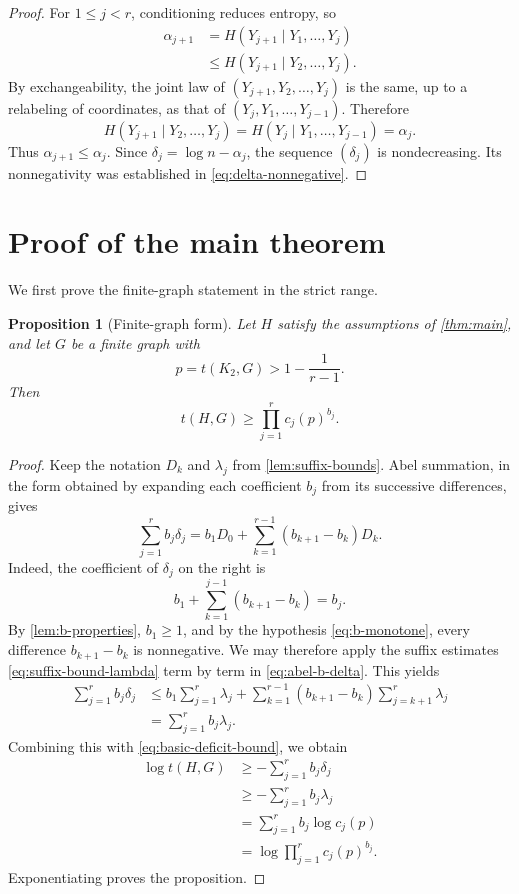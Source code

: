 \documentclass[11pt]{article}
\newtheorem{proposition}[proposition]{Proposition}
\numberwithin{equation}{section}
\begin{document}
\begin{proof}
For $1\leq j<r$, conditioning reduces entropy, so
\[
 \begin{aligned}
 \alpha_{j+1}
 &=H(Y_{j+1}\mid Y_1,\dots,Y_j)\\
 &\leq H(Y_{j+1}\mid Y_2,\dots,Y_j).
 \end{aligned}
\]
By exchangeability, the joint law of
$(Y_{j+1},Y_2,\dots,Y_j)$ is the same, up to a relabeling of coordinates,
as that of $(Y_j,Y_1,\dots,Y_{j-1})$.  Therefore
\[
 H(Y_{j+1}\mid Y_2,\dots,Y_j)
 =H(Y_j\mid Y_1,\dots,Y_{j-1})
 =\alpha_j.
\]
Thus $\alpha_{j+1}\leq\alpha_j$.  Since
$\delta_j=\log n-\alpha_j$, the sequence $(\delta_j)$ is nondecreasing.
Its nonnegativity was established in \eqref{eq:delta-nonnegative}.
\end{proof}

\section{Proof of the main theorem}\label{sec:main-proof}

We first prove the finite-graph statement in the strict range.

\begin{proposition}[Finite-graph form]\label{prop:finite-main}
Let $H$ satisfy the assumptions of \cref{thm:main}, and let $G$ be a
finite graph with
\[
 p=t(K_2,G)>1-\frac{1}{r-1}.
\]
Then
\[
 t(H,G)\geq\prod_{j=1}^r c_j(p)^{b_j}.
\]
\end{proposition}

\begin{proof}
Keep the notation $D_k$ and $\lambda_j$ from
\cref{lem:suffix-bounds}.  Abel summation, in the form obtained by
expanding each coefficient $b_j$ from its successive differences, gives
\begin{equation}
 \sum_{j=1}^r b_j\delta_j
 =
 b_1D_0
 +
 \sum_{k=1}^{r-1}(b_{k+1}-b_k)D_k.\label{eq:abel-b-delta}
\end{equation}
Indeed, the coefficient of $\delta_j$ on the right is
\[
 b_1+\sum_{k=1}^{j-1}(b_{k+1}-b_k)=b_j.
\]
By \cref{lem:b-properties}, $b_1\geq1$, and by the hypothesis
\eqref{eq:b-monotone}, every difference $b_{k+1}-b_k$ is nonnegative.
We may therefore apply the suffix estimates
\eqref{eq:suffix-bound-lambda} term by term in
\eqref{eq:abel-b-delta}.  This yields
\[
 \begin{aligned}
 \sum_{j=1}^r b_j\delta_j
 &\leq
 b_1\sum_{j=1}^r\lambda_j
 +
 \sum_{k=1}^{r-1}(b_{k+1}-b_k)
 \sum_{j=k+1}^r\lambda_j\\
 &=\sum_{j=1}^r b_j\lambda_j.
 \end{aligned}
\]
Combining this with \eqref{eq:basic-deficit-bound}, we obtain
\[
 \begin{aligned}
 \log t(H,G)
 &\geq-\sum_{j=1}^r b_j\delta_j\\
 &\geq-\sum_{j=1}^r b_j\lambda_j\\
 &=\sum_{j=1}^r b_j\log c_j(p)\\
 &=\log\prod_{j=1}^r c_j(p)^{b_j}.
\end{aligned}
\]
Exponentiating proves the proposition.
\end{proof}
\end{document}
